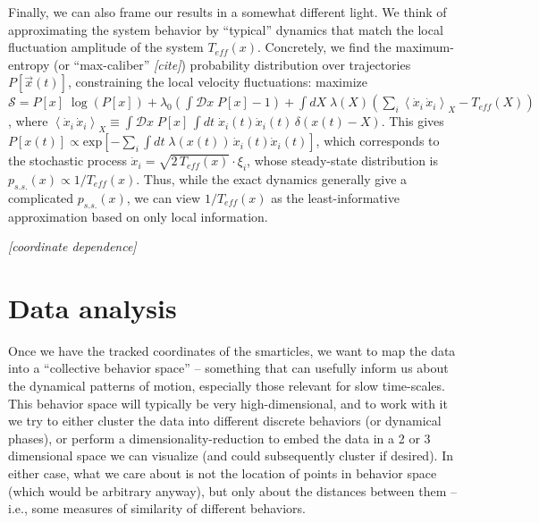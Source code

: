 \documentclass[11pt]{article}
\renewcommand{\v}[1]{\ensuremath{\vec{#1}}} %
\renewcommand{\=}[1]{\stackrel{#1}{=}} %
\renewcommand{\(}{\left (}
\renewcommand{\)}{\right  )}
\renewcommand{\[}{\left [}
\renewcommand{\]}{\right ]}
\newcommand{\<}{\left <}
\renewcommand{\>}{\right >}
\theoremstyle{definition}
\theoremstyle{remark}
\renewcommand{\exp}[1]{\mbox{exp}\[#1\]} %
\renewcommand{\todo}[1]{\textit{\color{red}[#1]}}
\begin{document}
Finally, we can also frame our results in a somewhat different light. We think of approximating the system behavior by ``typical'' dynamics that match the local fluctuation amplitude of the system $ T_{eff}(x) $. Concretely, we find the maximum-entropy (or ``max-caliber'' \todo{cite}) probability distribution over trajectories $ P[\v{x}(t)] $, constraining the local velocity fluctuations: maximize $ \mathcal{S} = P[x] \;\log\(P[x]\) + \lambda_0 \( \int \mathcal{D} x \;P[x] - 1\) + \int dX \; \lambda(X) \(\sum _i \< \dot{x}_i\,\dot{x}_i\> _X - T_{eff}(X)\)$, where $ \< \dot{x}_i\, \dot{x}_i\> _X \equiv \int \mathcal{D}x \; P[x] \,\int dt \; \dot{x}_i(t) \dot{x}_i(t) \,\delta(x(t) - X) $. This gives $ P[x(t)] \propto \exp{-\sum_i \int dt \; \lambda(x(t))\,\dot{x}_i(t)\dot{x}_i(t)} $, which corresponds to the stochastic process $ \dot{x}_i = \sqrt{2\,T_{eff}(x)}\cdot \xi_i$, whose steady-state distribution is $ p_{s.s.}(x)\propto 1/T_{eff}(x) $. Thus, while the exact dynamics generally give a complicated $ p_{s.s.}(x) $, we can view $1/T_{eff}(x) $ as the least-informative approximation based on only local information.

\todo{coordinate dependence}









\appendix
\renewcommand{\thesection}{\Alph{section}} 
\section{Data analysis} \label{app:dataAnal}

Once we have the tracked coordinates of the smarticles, we want to map the data into a ``collective behavior space'' -- something that can usefully inform us about the dynamical patterns of motion, especially those relevant for slow time-scales. This behavior space will typically be very high-dimensional, and to work with it we try to either cluster the data into different discrete behaviors (or dynamical phases), or perform a dimensionality-reduction to embed the data in a 2 or 3 dimensional space we can visualize (and could subsequently cluster if desired). In either case, what we care about is not the location of points in behavior space (which would be arbitrary anyway), but only about the distances between them -- i.e., some measures of similarity of different behaviors. 
\end{document}
